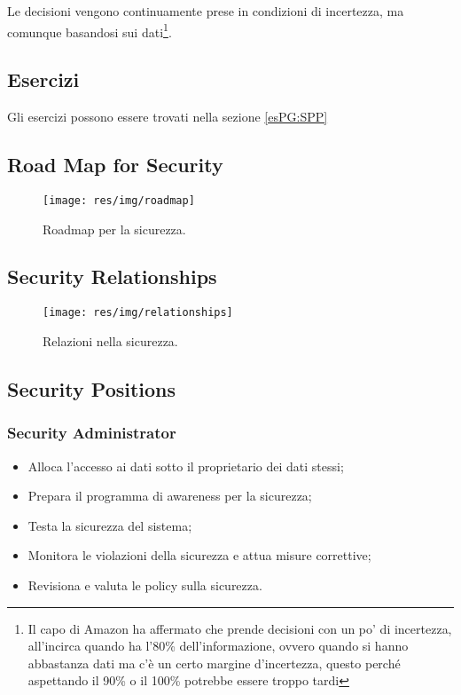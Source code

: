 Le decisioni vengono continuamente prese in condizioni di incertezza, ma
comunque basandosi sui dati\footnote{Il capo di Amazon ha affermato che prende
decisioni con un po' di incertezza, all'incirca quando ha l'80\%
dell'informazione, ovvero quando si hanno abbastanza dati ma c'è un certo
margine d'incertezza, questo perché aspettando il 90\% o il 100\% potrebbe
essere troppo tardi}.


\subsection{Esercizi}

Gli esercizi possono essere trovati nella sezione \ref{esPG:SPP}
\newpage
\subsection{Road Map for Security}

\begin{figure}[h!]
        \begin{center}
                \texttt{[image: res/img/roadmap]}
        \end{center}
        \caption{Roadmap per la sicurezza.}
\end{figure}

\subsection{Security Relationships}

\begin{figure}[h!]
        \begin{center}
                \texttt{[image: res/img/relationships]}
        \end{center}
        \caption{Relazioni nella sicurezza.}
\end{figure}


\subsection{Security Positions}

\subsubsection{Security Administrator}

\begin{itemize}
\item Alloca l'accesso ai dati sotto il proprietario dei dati stessi;
\item Prepara il programma di awareness per la sicurezza;
\item Testa la sicurezza del sistema;
\item Monitora le violazioni della sicurezza e attua misure correttive;
\item Revisiona e valuta le policy sulla sicurezza.
\end{itemize}

